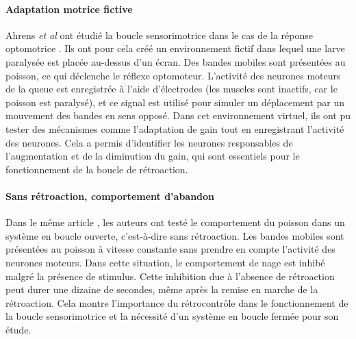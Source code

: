 \paragraph{Adaptation motrice fictive}
Ahrens \emph{et al} ont étudié la boucle sensorimotrice dans le cas de la réponse optomotrice \cite{ahrens_brain-wide_2012}. Ils ont pour cela créé un environnement fictif dans lequel une larve paralysée est placée au-dessus d'un écran. Des bandes mobiles sont présentées au poisson, ce qui déclenche le réflexe optomoteur. L'activité des neurones moteurs de la queue est enregistrée à l'aide d'électrodes (les muscles sont inactifs, car le poisson est paralysé), et ce signal est utilisé pour simuler un déplacement par un mouvement des bandes en sens opposé. Dans cet environnement virtuel, ils ont pu tester des mécanismes comme l'adaptation de gain tout en enregistrant l'activité des neurones. Cela a permis d'identifier les neurones responsables de l'augmentation et de la diminution du gain, qui sont essentiels pour le fonctionnement de la boucle de rétroaction.

\paragraph{Sans rétroaction, comportement d'abandon}
Dans le même article \cite{ahrens_brain-wide_2012}, les auteurs ont testé le comportement du poisson dans un système en boucle ouverte, c'est-à-dire sans rétroaction. Les bandes mobiles sont présentées au poisson à vitesse constante sans prendre en compte l'activité des neurones moteurs. Dans cette situation, le comportement de nage est inhibé malgré la présence de stimulus. Cette inhibition due à l'absence de rétroaction peut durer une dizaine de secondes, même après la remise en marche de la rétroaction. Cela montre l'importance du rétrocontrôle dans le fonctionnement de la boucle sensorimotrice et la nécessité d'un système en boucle fermée pour son étude. 




